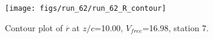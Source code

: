 \begin{figure}[H]
\centering
\texttt{[image: figs/run\_62/run\_62\_R\_contour]}
\caption{Contour plot of $\overline{r}$ at $z/c$=10.00, $V_{free}$=16.98, station 7.}
\label{fig:run_62_R_contour}
\end{figure}


